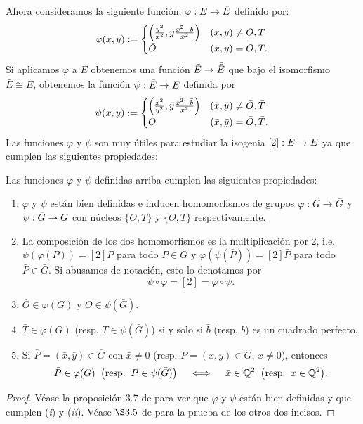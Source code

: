 \documentclass[../../tesis_maestria]{subfiles}
\begin{document}
Ahora consideramos la siguiente función: $\varphi:E\rightarrow \bar{E}$ definido por:
\[
	\varphi(x,y):=\begin{cases}
		\left( \tfrac{y^2}{x^2},y\tfrac{x^2-b}{x^2} \right) & (x,y)\neq O,T\\
		\bar{O} & (x,y)=O,T.
	\end{cases}
\]
Si aplicamos $\varphi$ a $\bar{E}$ obtenemos una función $\bar{E}\rightarrow\bar{\bar{E}}$ que bajo el isomorfismo $\bar{\bar{E}}\cong E$, obtenemos la función $\psi:\bar{E}\rightarrow E$ definida por
\[
	\psi(\bar{x},\bar{y}):=\begin{cases}
		\left( \tfrac{\bar{x}^2}{\bar{y}^2},\bar{y}\tfrac{\bar{x}^2-\bar{b}}{\bar{x}^2} \right) & (\bar{x},\bar{y})\neq \bar{O},\bar{T}\\
		O & (\bar{x},\bar{y})=\bar{O},\bar{T}.
	\end{cases}
\]
Las funciones $\varphi$ y $\psi$ son muy útiles para estudiar la isogenia $[2]:E\rightarrow E$ ya que cumplen las siguientes propiedades:

\begin{prop}\label{prop:descomponer-2}
	Las funciones $\varphi$ y $\psi$ definidas arriba cumplen las siguientes propiedades:
	\begin{enumerate}[label=(\roman*)]
		\item $\varphi$ y $\psi$ están bien definidas e inducen homomorfismos de grupos $\varphi:G\rightarrow \bar{G}$ y $\psi:\bar{G}\rightarrow G$ con núcleos $\{O,T\}$ y $\{\bar{O},\bar{T}\}$ respectivamente.
		\item\label{in:mult2} La composición de los dos homomorfismos es la multiplicación por 2, i.e. $\psi(\varphi(P))=[2]P$ para todo $P\in G$ y $\varphi(\psi(\bar{P}))=[2]\bar{P}$ para todo $\bar{P}\in\bar{G}$. Si abusamos de notación, esto lo denotamos por $$\psi\circ\varphi=[2]=\varphi\circ\psi.$$
		\item\label{in:0imagen} $\bar{O}\in\varphi(G)$ y $O\in\psi(\bar{G})$.
		\item\label{in:imagenTbar} $\bar{T}\in\varphi(G)$ (resp. $T\in\psi(\bar{G})$) si y solo si $\bar{b}$ (resp. $b$) es un cuadrado perfecto.
		\item\label{in:imagen} Si $\bar{P}=(\bar{x},\bar{y})\in\bar{G}$ con $\bar{x}\neq0$ (resp. $P=(x,y)\in G$, $x\neq0$), entonces
		\[
			\bar{P}\in\varphi(G)\;\;\big(\mathrm{resp}.\;\; P\in\psi(\bar{G})\big)\quad\iff\quad\bar{x}\in\mathbb{Q}^2\;\;\big(\mathrm{resp}.\;\; x\in\mathbb{Q}^2 \big).
		\]
	\end{enumerate}
\end{prop}
\begin{proof}
		Véase la proposición 3.7 de \cite{SilvermanTateRPOEC} para ver que $\varphi$ y $\psi$ están bien definidas y que cumplen (\emph{i}) y (\emph{ii}). Véase $\S3.5$ de \cite{SilvermanTateRPOEC} para la prueba de los otros dos incisos.
\end{proof}
\end{document}
